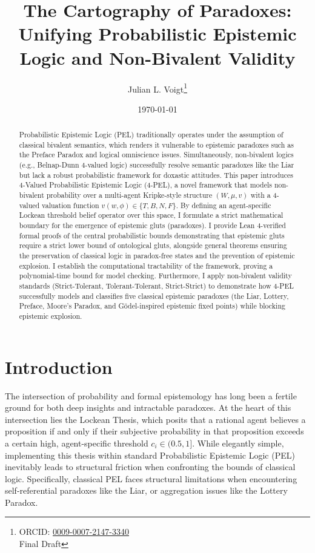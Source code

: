 \documentclass[11pt,a4paper]{article}
\title{\textbf{The Cartography of Paradoxes: \\ Unifying Probabilistic Epistemic Logic and Non-Bivalent Validity}}
\author{Julian L. Voigt\thanks{ORCID: \href{https://orcid.org/0009-0007-2147-3340}{0009-0007-2147-3340} \\ Final Draft}}
\date{\today}
\begin{document}
\maketitle

\begin{abstract}
Probabilistic Epistemic Logic (PEL) traditionally operates under the assumption of classical bivalent semantics, which renders it vulnerable to epistemic paradoxes such as the Preface Paradox and logical omniscience issues. Simultaneously, non-bivalent logics (e.g., Belnap-Dunn 4-valued logic) successfully resolve semantic paradoxes like the Liar but lack a robust probabilistic framework for doxastic attitudes. This paper introduces 4-Valued Probabilistic Epistemic Logic (4-PEL), a novel framework that models non-bivalent probability over a multi-agent Kripke-style structure $(W, \mu, v)$ with a 4-valued valuation function $v(w, \phi) \in \{T, B, N, F\}$. By defining an agent-specific Lockean threshold belief operator over this space, I formulate a strict mathematical boundary for the emergence of epistemic gluts (paradoxes). I provide Lean 4-verified formal proofs of the central probabilistic bounds demonstrating that epistemic gluts require a strict lower bound of ontological gluts, alongside general theorems ensuring the preservation of classical logic in paradox-free states and the prevention of epistemic explosion. I establish the computational tractability of the framework, proving a polynomial-time bound for model checking. Furthermore, I apply non-bivalent validity standards (Strict-Tolerant, Tolerant-Tolerant, Strict-Strict) to demonstrate how 4-PEL successfully models and classifies five classical epistemic paradoxes (the Liar, Lottery, Preface, Moore's Paradox, and G\"odel-inspired epistemic fixed points) while blocking epistemic explosion.
\end{abstract}

\section{Introduction}

The intersection of probability and formal epistemology has long been a fertile ground for both deep insights and intractable paradoxes. At the heart of this intersection lies the Lockean Thesis, which posits that a rational agent believes a proposition if and only if their subjective probability in that proposition exceeds a certain high, agent-specific threshold $c_i \in (0.5, 1]$. While elegantly simple, implementing this thesis within standard Probabilistic Epistemic Logic (PEL) inevitably leads to structural friction when confronting the bounds of classical logic. Specifically, classical PEL faces structural limitations when encountering self-referential paradoxes like the Liar, or aggregation issues like the Lottery Paradox.
\end{document}
